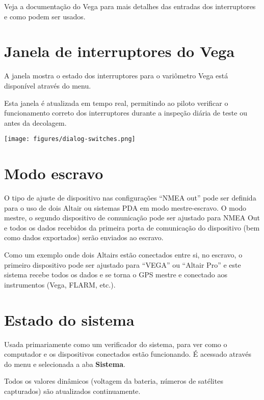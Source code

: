 Veja a documentação do Vega para mais detalhes das entradas dos interruptores e como podem ser usados.


\section{Janela de interruptores do Vega}

A janela mostra o estado dos interruptores para o variômetro Vega está disponível através do menu.

Esta janela é atualizada em tempo real, permitindo ao piloto verificar o funcionamento correto dos interruptores durante a inspeção diária de teste ou antes da decolagem.  

\begin{center}
\texttt{[image: figures/dialog-switches.png]}
\end{center}

\section{Modo escravo}

O tipo de ajuste de dispositivo nas configurações “NMEA out” pode ser definida para o uso de dois Altair ou sistemas PDA em modo mestre-escravo.  O modo mestre, o segundo dispositivo de comunicação pode ser ajustado para NMEA Out e todos os dados recebidos da primeira porta de comunicação do dispositivo (bem como dados exportados) serão enviados ao escravo.

Como um exemplo onde dois Altairs estão conectados entre si, no escravo, o primeiro dispositivo pode ser ajustado para “VEGA” ou “Altair Pro” e este sistema recebe todos os dados e se torna o GPS mestre e conectado aos instrumentos (Vega, FLARM, etc.).


\section{Estado do sistema}\label{sec:system-status}

Usada primariamente como um verificador do sistema, para ver como o computador e os dispositivos conectados estão funcionando.  É acessado através do menu e selecionada a aba {\bf Sistema}.

Todos os valores dinâmicos (voltagem da bateria, números de satélites capturados) são atualizados continuamente.  

